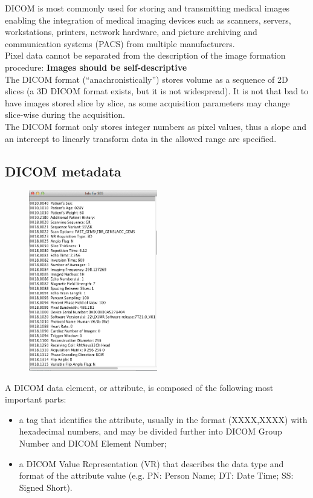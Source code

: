 DICOM is most commonly used for storing and transmitting medical images enabling the integration of medical imaging devices such as scanners, servers, workstations, printers, network hardware, and picture archiving and communication systems (PACS) from multiple manufacturers.\\

Pixel data cannot be separated from the description of the image formation procedure: \textbf{Images should be self-descriptive}\\

The DICOM format (“anachronistically”) stores volume as a sequence of 2D slices (a 3D DICOM format exists, but it is not widespread). It is not that bad to have images stored slice by slice, as some acquisition parameters may change slice-wise during the acquisition.\\

The DICOM format only stores integer numbers as pixel values, thus a slope and an intercept to linearly transform data in the allowed range are specified.

\newpage
\subsection{DICOM metadata}

\begin{figure}
	\includegraphics[width=0.5\textwidth]{figure_med/dicom_meta}
\end{figure} 


A DICOM data element, or attribute, is composed of the
following most important parts:
\begin{itemize}

\item a tag that identifies the attribute, usually in the format
(XXXX,XXXX) with hexadecimal numbers, and may be divided
further into DICOM Group Number and DICOM Element Number;
\item a DICOM Value Representation (VR) that describes the data type
and format of the attribute value (e.g. PN: Person Name; DT: Date
Time; SS: Signed Short).\\

\end{itemize}


